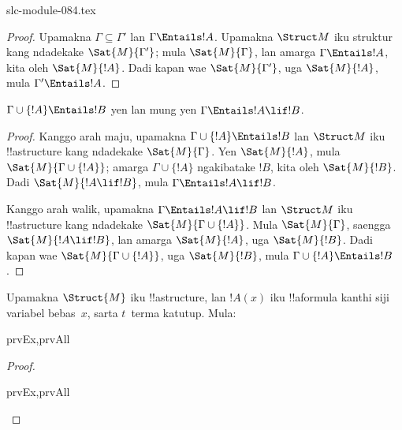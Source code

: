 \begin{filecontents*}[overwrite]{slc-module-084.tex}
\begin{proof}
Upamakna $\Gamma \subseteq \Gamma'$ lan
$\Gamma \Entails !A$. Upamakna $\Struct M$ iku
struktur kang ndadekake $\Sat{M}{\Gamma'}$;
mula $\Sat{M}{\Gamma}$, lan amarga
$\Gamma \Entails !A$, kita oleh $\Sat{M}{!A}$.
Dadi kapan wae $\Sat{M}{\Gamma'}$, uga
$\Sat{M}{!A}$, mula $\Gamma' \Entails !A$.
\end{proof}


\begin{thm}
$\Gamma \cup \{!A\} \Entails !B$ yen lan mung yen
$\Gamma \Entails !A \lif !B$.
\end{thm}

\begin{proof}
Kanggo arah maju, upamakna
$\Gamma \cup \{ !A \} \Entails !B$ lan
$\Struct M$ iku !!a{structure} kang ndadekake
$\Sat{M}{\Gamma}$. Yen $\Sat{M}{!A}$,
mula $\Sat{M}{\Gamma \cup \{ !A \} }$;
amarga $\Gamma \cup \{ !A \}$ ngakibatake $!B$,
kita oleh $\Sat{M}{!B}$. Dadi
$\Sat{M}{!A \lif !B}$, mula
$\Gamma \Entails !A \lif !B$.

Kanggo arah walik, upamakna
$\Gamma \Entails !A \lif !B$ lan
$\Struct M$ iku !!a{structure} kang ndadekake
$\Sat{M}{\Gamma \cup \{ !A
  \}}$. Mula $\Sat{M}{\Gamma}$, saengga
$\Sat{M}{!A \lif !B}$, lan amarga
$\Sat{M}{!A}$, uga $\Sat{M}{!B}$.
Dadi kapan wae $\Sat{M}{\Gamma \cup \{
  !A \} }$, uga $\Sat{M}{!B}$,
mula $\Gamma \cup \{ !A \} \Entails !B$.
\end{proof}

\begin{prop}
  Upamakna $\Struct{M}$ iku !!a{structure},
  lan $!A(x)$ iku !!a{formula} kanthi siji
  variabel bebas~$x$, sarta $t$~terma katutup. Mula:
  \begin{tagenumerate}{prvEx,prvAll}
  \end{tagenumerate}
\end{prop}

\begin{proof}
  \begin{tagenumerate}{prvEx,prvAll}
  \end{tagenumerate}
\end{proof}


\end{filecontents*}

